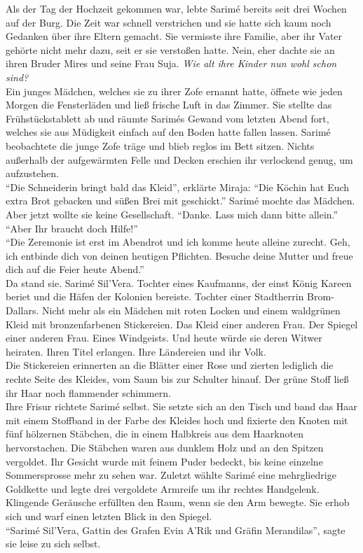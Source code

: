 Als der Tag der Hochzeit gekommen war, lebte Sarimé bereits seit drei Wochen auf der Burg. Die Zeit 
war schnell verstrichen und sie hatte sich kaum noch Gedanken über ihre Eltern gemacht. Sie 
vermisste ihre Familie, aber ihr Vater gehörte nicht mehr dazu, seit er sie verstoßen hatte. Nein, 
eher dachte sie an ihren Bruder Mires und seine Frau Suja. \textit{Wie alt ihre Kinder nun wohl 
schon sind?}\\
Ein junges Mädchen, welches sie zu ihrer Zofe ernannt hatte, öffnete wie jeden Morgen die 
Fensterläden und ließ frische Luft in das Zimmer. Sie stellte das Frühstückstablett ab und räumte 
Sarimés Gewand vom letzten Abend fort, welches sie aus Müdigkeit einfach auf den Boden hatte fallen 
lassen. Sarimé beobachtete die junge Zofe träge und blieb reglos im Bett sitzen. Nichts außerhalb 
der aufgewärmten Felle und Decken erschien ihr verlockend genug, um aufzustehen.\\
``Die Schneiderin bringt bald das Kleid'', erklärte Miraja: ``Die Köchin hat Euch extra Brot 
gebacken und süßen Brei mit geschickt.''
Sarimé mochte das Mädchen. Aber jetzt wollte sie keine Gesellschaft. ``Danke. Lass mich dann 
bitte allein.''\\
``Aber Ihr braucht doch Hilfe!''\\
``Die Zeremonie ist erst im Abendrot und ich komme heute alleine zurecht. Geh, ich entbinde dich 
von deinen heutigen Pflichten. Besuche deine Mutter und freue dich auf die Feier heute Abend.''\\



Da stand sie. Sarimé Sil'Vera. Tochter eines Kaufmanns, der einst König Kareen beriet und die 
Häfen der Kolonien bereiste. Tochter einer Stadtherrin Brom-Dallars. Nicht mehr als ein Mädchen 
mit roten Locken und einem waldgrünen Kleid mit bronzenfarbenen Stickereien. Das Kleid einer 
anderen Frau. Der Spiegel einer anderen Frau. Eines Windgeists. Und heute würde sie deren Witwer 
heiraten. Ihren Titel erlangen. Ihre Ländereien und ihr Volk.\\
Die Stickereien erinnerten an die Blätter einer Rose und zierten lediglich die rechte Seite des 
Kleides, vom Saum bis zur Schulter hinauf. Der grüne Stoff ließ ihr Haar noch flammender 
schimmern.\\
Ihre Frisur richtete Sarimé selbst. Sie setzte sich an den Tisch und band das Haar mit 
einem Stoffband in der Farbe des Kleides hoch und fixierte den Knoten mit fünf hölzernen Stäbchen, 
die in einem Halbkreis aus dem Haarknoten hervorstachen. Die Stäbchen waren aus dunklem Holz und an 
den Spitzen vergoldet. Ihr Gesicht wurde mit feinem Puder bedeckt, bis keine einzelne 
Sommersprosse mehr zu sehen war. Zuletzt wählte Sarimé eine mehrgliedrige Goldkette und legte drei 
vergoldete Armreife um ihr rechtes Handgelenk. Klingende Geräusche erfüllten den Raum, wenn sie den 
Arm bewegte. Sie erhob sich und warf einen letzten Blick in den Spiegel.\\
``Sarimé Sil'Vera, Gattin des Grafen Evin A'Rik und Gräfin Merandilas'', sagte sie leise zu sich 
selbst.\\

